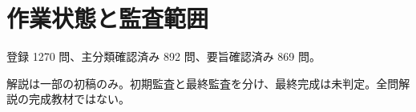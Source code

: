 \chapter{作業状態と監査範囲}
登録 1270 問、主分類確認済み 892 問、要旨確認済み 869 問。
\par 解説は一部の初稿のみ。初期監査と最終監査を分け、最終完成は未判定。全問解説の完成教材ではない。
